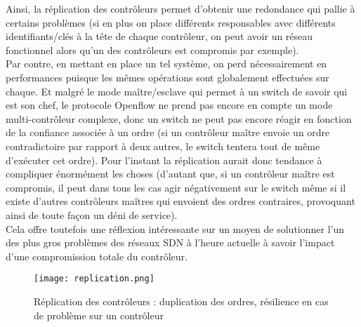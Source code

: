 Ainsi, la réplication des contrôleurs permet d'obtenir une redondance qui pallie à certains problèmes (si en plus on place différents responsables avec différents identifiants/clés à la tête de chaque contrôleur, on peut avoir un réseau fonctionnel alors qu'un des contrôleurs est compromis par exemple).\\
Par contre, en mettant en place un tel système, on perd nécessairement en performances puisque les mêmes opérations sont globalement effectuées sur chaque. Et malgré le mode maître/esclave qui permet à un switch de savoir qui est son chef, le protocole Openflow ne prend pas encore en compte un mode multi-contrôleur complexe, donc un switch ne peut pas encore réagir en fonction de la confiance associée à un ordre (si un contrôleur maître envoie un ordre contradictoire par rapport à deux autres, le switch tentera tout de même d'exécuter cet ordre). Pour l'instant la réplication aurait donc tendance à compliquer énormément les choses (d'autant que, si un contrôleur maître est compromis, il peut dans tous les cas agir négativement sur le switch même si il existe d'autres contrôleurs maîtres qui envoient des ordres contraires, provoquant ainsi de toute façon un déni de service).\\
Cela offre toutefois une réflexion intéressante sur un moyen de solutionner l'un des plus gros problèmes des réseaux SDN à l'heure actuelle à savoir l'impact d'une compromission totale du contrôleur.

\begin{figure}[h]
  	\centering
  	\texttt{[image: replication.png]}
  	\caption{Réplication des contrôleurs : duplication des ordres, résilience en cas de problème sur un contrôleur}
\end{figure}
